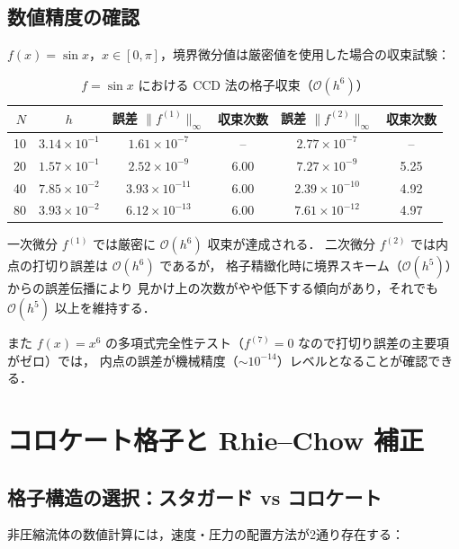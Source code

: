 \documentclass[12pt, a4paper, titlepage]{article}
\newcommand{\jp}[1]{{\normalfont\jpfont #1}}
\newcommand{\Ord}[1]{\mathcal{O}(#1)}
\newcommand{\fp}[1]{f^{(1)}_{#1}}
\newcommand{\fpp}[1]{f^{(2)}_{#1}}
\begin{document}
\subsection{\jp{数値精度の確認}}

\jp{$f(x) = \sin x$，$x\in[0,\pi]$，境界微分値は厳密値を使用した場合の収束試験：}

\begin{table}[h]
\centering
\caption{$f=\sin x$ \jp{における CCD 法の格子収束（$\Ord{h^6}$）}}
\label{tab:convergence}
\begin{tabular}{rccccc}
\toprule
$N$ & $h$ & \jp{誤差} $\|\fp{}\|_\infty$ & \jp{収束次数} & \jp{誤差} $\|\fpp{}\|_\infty$ & \jp{収束次数}\\
\midrule
10  & $3.14\times10^{-1}$ & $1.61\times10^{-7}$ & --   & $2.77\times10^{-7}$ & --\\
20  & $1.57\times10^{-1}$ & $2.52\times10^{-9}$ & 6.00 & $7.27\times10^{-9}$  & 5.25\\
40  & $7.85\times10^{-2}$ & $3.93\times10^{-11}$ & 6.00 & $2.39\times10^{-10}$ & 4.92\\
80  & $3.93\times10^{-2}$ & $6.12\times10^{-13}$ & 6.00 & $7.61\times10^{-12}$ & 4.97\\
\bottomrule
\end{tabular}
\end{table}

\jp{一次微分 $\fp{}$ では厳密に $\Ord{h^6}$ 収束が達成される．
二次微分 $\fpp{}$ では内点の打切り誤差は $\Ord{h^6}$ であるが，
格子精緻化時に境界スキーム（$\Ord{h^5}$）からの誤差伝播により
見かけ上の次数がやや低下する傾向があり，それでも $\Ord{h^5}$ 以上を維持する．}

\jp{また $f(x)=x^6$ の多項式完全性テスト（$f^{(7)}=0$ なので打切り誤差の主要項がゼロ）では，
内点の誤差が機械精度（$\sim10^{-14}$）レベルとなることが確認できる．}


\section{\jp{コロケート格子と Rhie--Chow 補正}}
\label{sec:collocate}

\subsection{\jp{格子構造の選択：スタガード vs コロケート}}

\jp{非圧縮流体の数値計算には，速度・圧力の配置方法が2通り存在する：}
\end{document}
